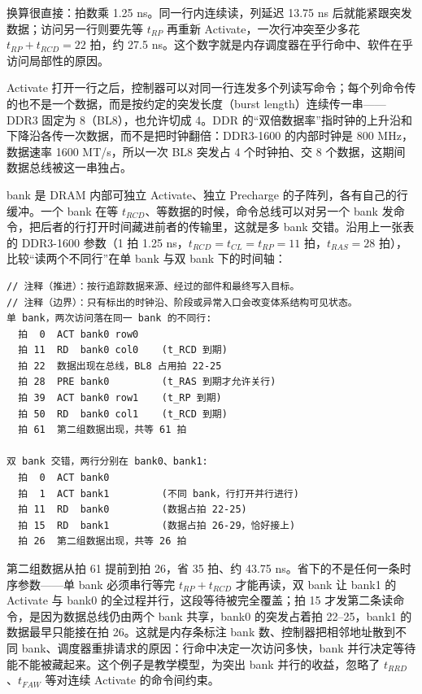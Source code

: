 换算很直接：拍数乘 1.25 ns。同一行内连续读，列延迟 13.75 ns 后就能紧跟突发数据；访问另一行则要先等 $t_{RP}$ 再重新 Activate，一次行冲突至少多花 $t_{RP}+t_{RCD}=22$ 拍，约 27.5 ns。这个数字就是内存调度器在乎行命中、软件在乎访问局部性的原因。

Activate 打开一行之后，控制器可以对同一行连发多个列读写命令；每个列命令传的也不是一个数据，而是按约定的突发长度（burst length）连续传一串——DDR3 固定为 8（BL8），也允许切成 4。DDR 的“双倍数据率”指时钟的上升沿和下降沿各传一次数据，而不是把时钟翻倍：DDR3-1600 的内部时钟是 800 MHz，数据速率 1600 MT/s，所以一次 BL8 突发占 4 个时钟拍、交 8 个数据，这期间数据总线被这一串独占。

bank 是 DRAM 内部可独立 Activate、独立 Precharge 的子阵列，各有自己的行缓冲。一个 bank 在等 $t_{RCD}$、等数据的时候，命令总线可以对另一个 bank 发命令，把后者的行打开时间藏进前者的传输里，这就是多 bank 交错。沿用上一张表的 DDR3-1600 参数（1 拍 1.25 ns，$t_{RCD}=t_{CL}=t_{RP}=11$ 拍，$t_{RAS}=28$ 拍），比较“读两个不同行”在单 bank 与双 bank 下的时间轴：

\begin{lstlisting}
// 注释（推进）：按行追踪数据来源、经过的部件和最终写入目标。
// 注释（边界）：只有标出的时钟沿、阶段或异常入口会改变体系结构可见状态。
单 bank，两次访问落在同一 bank 的不同行:
  拍  0  ACT bank0 row0
  拍 11  RD  bank0 col0    (t_RCD 到期)
  拍 22  数据出现在总线，BL8 占用拍 22-25
  拍 28  PRE bank0         (t_RAS 到期才允许关行)
  拍 39  ACT bank0 row1    (t_RP 到期)
  拍 50  RD  bank0 col1    (t_RCD 到期)
  拍 61  第二组数据出现，共等 61 拍

双 bank 交错，两行分别在 bank0、bank1:
  拍  0  ACT bank0
  拍  1  ACT bank1         (不同 bank，行打开并行进行)
  拍 11  RD  bank0         (数据占拍 22-25)
  拍 15  RD  bank1         (数据占拍 26-29，恰好接上)
  拍 26  第二组数据出现，共等 26 拍
\end{lstlisting}

第二组数据从拍 61 提前到拍 26，省 35 拍、约 43.75 ns。省下的不是任何一条时序参数——单 bank 必须串行等完 $t_{RP}+t_{RCD}$ 才能再读，双 bank 让 bank1 的 Activate 与 bank0 的全过程并行，这段等待被完全覆盖；拍 15 才发第二条读命令，是因为数据总线仍由两个 bank 共享，bank0 的突发占着拍 22--25，bank1 的数据最早只能接在拍 26。这就是内存条标注 bank 数、控制器把相邻地址散到不同 bank、调度器重排请求的原因：行命中决定一次访问多快，bank 并行决定等待能不能被藏起来。这个例子是教学模型，为突出 bank 并行的收益，忽略了 $t_{RRD}$、$t_{FAW}$ 等对连续 Activate 的命令间约束。


